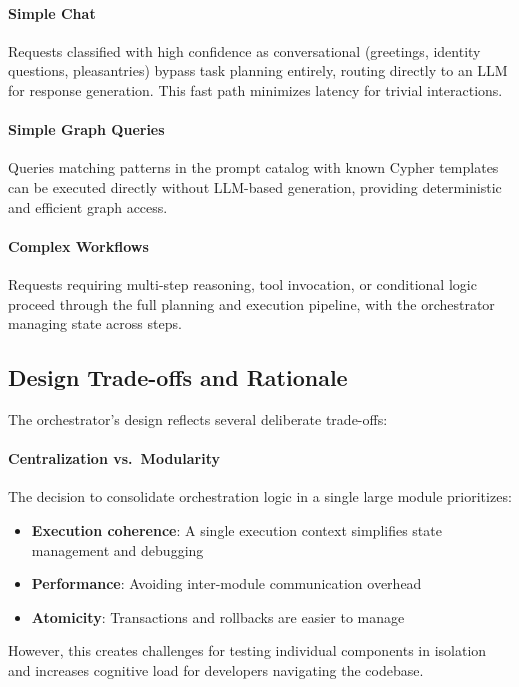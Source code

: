\documentclass[a4paper,twoside]{sapthesis}
\begin{document}
\paragraph{Simple Chat} Requests classified with high confidence as conversational (greetings, identity questions, pleasantries) bypass task planning entirely, routing directly to an LLM for response generation. This fast path minimizes latency for trivial interactions.

\paragraph{Simple Graph Queries} Queries matching patterns in the prompt catalog with known Cypher templates can be executed directly without LLM-based generation, providing deterministic and efficient graph access.

\paragraph{Complex Workflows} Requests requiring multi-step reasoning, tool invocation, or conditional logic proceed through the full planning and execution pipeline, with the orchestrator managing state across steps.

\subsection{Design Trade-offs and Rationale}

The orchestrator's design reflects several deliberate trade-offs:

\paragraph{Centralization vs.\ Modularity} The decision to consolidate orchestration logic in a single large module prioritizes:
\begin{itemize}
    \item \textbf{Execution coherence}: A single execution context simplifies state management and debugging
    \item \textbf{Performance}: Avoiding inter-module communication overhead
    \item \textbf{Atomicity}: Transactions and rollbacks are easier to manage
\end{itemize}
However, this creates challenges for testing individual components in isolation and increases cognitive load for developers navigating the codebase.
\end{document}
